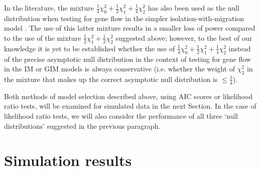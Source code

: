\documentclass[11pt]{article}
\begin{document}
In the literature, the mixture $\frac{1}{4} \chi^2_0 +\frac{1}{2} \chi^2_1 +\frac{1}{4} \chi^2_2$ has also been used as the null distribution when testing for gene flow in the simpler isolation-with-migration model \citep{Wang2010}. The use of this latter mixture results in a smaller loss of power compared to the use of the mixture $\frac{1}{2} \chi^2_1 +\frac{1}{2} \chi^2_2$ suggested above; however, to the best of our knowledge it is yet to be established whether the use of $\frac{1}{4} \chi^2_0 +\frac{1}{2} \chi^2_1 +\frac{1}{4} \chi^2_2$ instead of the precise asymptotic null distribution in the context of testing for gene flow in the IM or GIM models is always conservative (i.e. whether the weight of $\chi^2_2$ in the mixture that makes up the correct asymptotic null distribution is $\leq \frac{1}{4}$).

Both methods of model selection described above, using AIC scores or likelihood ratio tests, will be examined for simulated data in the next Section.
In the case of likelihood ratio tests, we will also consider
the performance of all three `null distributions' suggested in the previous paragraph.


\section{Simulation results}
\label{Section: simulation results}

\end{document}
